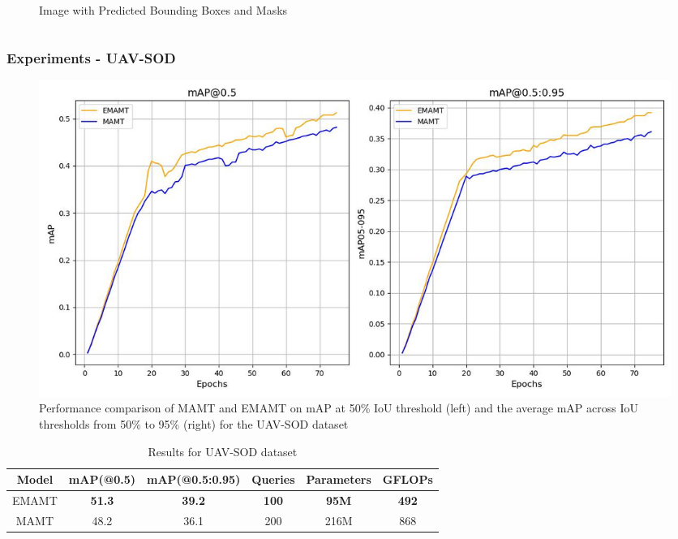 \documentclass{beamer}
\begin{document}
\begin{frame}[t]
\begin{columns}
\begin{column}{0.5\textwidth}
\begin{figure}
        \caption{Image with Predicted Bounding Boxes and Masks}
        \label{fig:post-pre-process}
      \end{figure}
    \end{column}
  \end{columns}
\end{frame}


\begin{frame}[t]
  \scriptsize
  \frametitle{Experiments - UAV-SOD}

  \begin{figure}[h!]
    \centering
    \includegraphics[scale=0.25]{Figures/uav_train.jpg}
    \caption{Performance comparison of MAMT and EMAMT on mAP at 50\% IoU threshold (left) and the average mAP across IoU thresholds from 50\% to 95\% (right) 
    for the UAV-SOD dataset}
    \label{fig:uav-train}
\end{figure}

  \begin{table}[h]
    \centering
    \begin{tabular}{|c|c|c|c|c|c|}
        \hline
        \textbf{Model}     & \textbf{mAP(@0.5)}    & \textbf{mAP(@0.5:0.95)}    & \textbf{Queries}   & \textbf{Parameters} & \textbf{GFLOPs}  \\ \hline
        EMAMT              & \textbf{51.3}         & \textbf{39.2}              & \textbf{100}       & \textbf{95M}        &  \textbf{492}     \\ \hline
        MAMT               & 48.2                  & 36.1                       & 200                & 216M                &  868              \\ \hline
    \end{tabular}
    \caption{Results for UAV-SOD dataset}
    \label{tab:uav_results}
  \end{table}
\end{frame}
\end{document}

